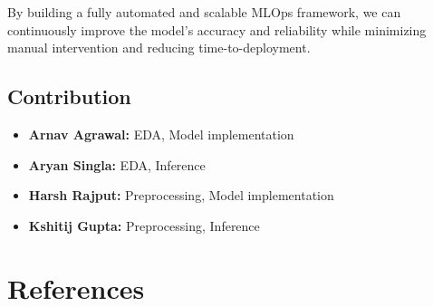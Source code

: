 \documentclass[10pt,twocolumn,letterpaper]{article}
\begin{document}
By building a fully automated and scalable MLOps framework, we can continuously improve the model's accuracy and reliability while minimizing manual intervention and reducing time-to-deployment.

\subsection{Contribution}
\begin{itemize}
    \item \textbf {Arnav Agrawal:} EDA, Model implementation 
    \item \textbf {Aryan Singla:} EDA, Inference 
    \item \textbf {Harsh Rajput:} Preprocessing, Model implementation
    \item \textbf {Kshitij Gupta:} Preprocessing, Inference 
\end{itemize}

\section{References}
{\small


}
\end{document}
